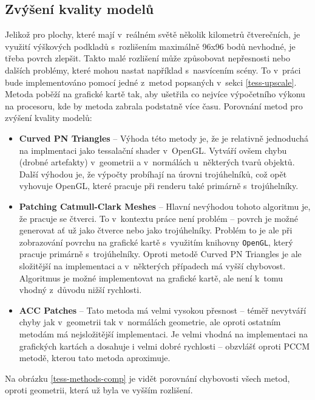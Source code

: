 \subsection*{Zvýšení kvality modelů} \label{tess-method-selection}
Jelikož pro plochy, které mají v~reálném světě několik kilometrů čtverečních, je využití výškových podkladů s~rozlišením maximálně 96x96 bodů nevhodné, je třeba povrch zlepšit. Takto malé rozlišení může způsobovat nepřesnosti nebo dalších problémy, které mohou nastat například s~nasvícením scény. To v~práci bude implementováno pomocí jedné z~metod popsaných v~sekci \ref{tess-upscale}. Metoda poběží na grafické kartě tak, aby ušetřila co nejvíce výpočetního výkonu na procesoru, kde by metoda zabrala podstatně více času. Porovnání metod pro zvýšení kvality modelů:


\begin{itemize}
    \item \textbf{Curved PN Triangles} -- Výhoda této metody je, že je relativně jednoduchá na implmentaci jako tessalační shader v~OpenGL. Vytváří ovšem chybu (drobné artefakty) v~geometrii a v~normálách u~některých tvarů objektů. Další výhodou je, že výpočty probíhají na úrovni trojúhelníků, což opět vyhovuje OpenGL, které pracuje při renderu také primárně s~trojúhelníky.
    
    \item \textbf{Patching Catmull-Clark Meshes} -- Hlavní nevýhodou tohoto algoritmu je, že pracuje se čtverci. To v~kontextu práce není problém -- povrch je možné generovat ať už jako čtverce nebo jako trojúhelníky. Problém to je ale při zobrazování povrchu na grafické kartě s~využitím knihovny \verb|OpenGL|, který pracuje primárně s~trojúhelníky. Oproti metodě Curved PN Triangles je ale složitější na implementaci a v~některých případech má vyšší chybovost. Algoritmus je možné implementovat na grafické kartě, ale není k~tomu vhodný z~důvodu nižší rychlosti. 
    
    \item \textbf{ACC Patches} -- Tato metoda má velmi vysokou přesnost -- téměř nevytváří chyby jak v~geometrii tak v~normálách geometrie, ale oproti ostatním metodám má nejsložitější implementaci. Je velmi vhodná na implementaci na grafických kartách a dosahuje i velmi dobré rychlosti -- obzvlášť oproti PCCM metodě, kterou tato metoda aproximuje.
\end{itemize}

Na obrázku \ref{tess-methods-comp} je vidět porovnání chybovosti všech metod, oproti geometrii, která už byla ve vyšším rozlišení.


